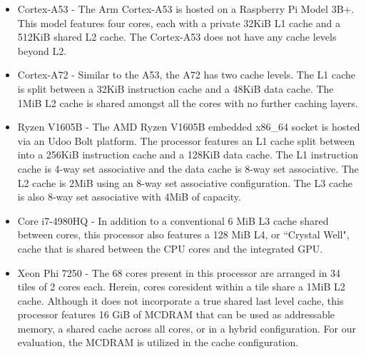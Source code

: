 \begin{itemize}
\item Cortex-A53 -  The Arm Cortex-A53 is hosted on a Raspberry Pi Model 3B+.
This model features four cores, each with a private 32KiB L1 cache and a 512KiB shared L2 cache.
The Cortex-A53 does not have any cache levels beyond L2.
\newline
\item Cortex-A72 - Similar to the A53, the A72 has two cache levels.
The L1 cache is split between a 32KiB instruction cache and a 48KiB data cache.
The 1MiB L2 cache is shared amongst all the cores with no further caching layers.
\newline
\item Ryzen V1605B - The AMD Ryzen V1605B embedded x86\_64 socket is hosted via an Udoo Bolt platform.
The processor features an L1 cache split between into a 256KiB instruction cache and a 128KiB data cache.
The L1 instruction cache is 4-way set associative and the data cache is 8-way set associative.
The L2 cache is 2MiB using an 8-way set associative configuration.
The L3 cache is also 8-way set associative with 4MiB of capacity.  
\newline
\item Core i7-4980HQ - In addition to a conventional 6 MiB L3 cache shared between cores, this processor also features a 128 MiB L4, or ``Crystal Well", cache that is shared between the CPU cores and the integrated GPU.
\newline
\item Xeon Phi 7250 - The 68 cores present in this processor are arranged in 34 tiles of 2 cores each.
Herein, cores coresident within a tile share a 1MiB L2 cache.
Although it does not incorporate a true shared last level cache, this processor features 16 GiB of MCDRAM that can be used as addressable memory, a shared cache across all cores, or in a hybrid configuration. 
For our evaluation, the MCDRAM is utilized in the cache configuration.
\end{itemize}



